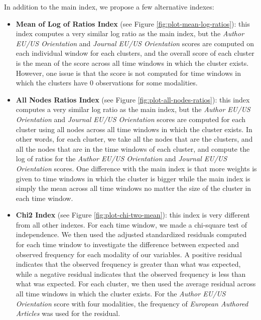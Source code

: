 \documentclass[
  12pt,
  onecolumn]{article}
\providecommand{\tightlist}{%
  \setlength{\itemsep}{0pt}\setlength{\parskip}{0pt}}
\begin{document}
In addition to the main index, we propose a few alternative indexes:

\begin{itemize}
\tightlist
\item
  \textbf{Mean of Log of Ratios Index} (see Figure
  \ref{fig:plot-mean-log-ratios}): this index computes a very similar
  log ratio as the main index, but the \emph{Author EU/US Orientation}
  and \emph{Journal EU/US Orientation} scores are computed on each
  individual window for each clusters, and the overall score of each
  cluster is the mean of the score across all time windows in which the
  cluster exists. However, one issue is that the score is not computed
  for time windows in which the clusters have 0 observations for some
  modalities.
\item
  \textbf{All Nodes Ratios Index} (see Figure
  \ref{fig:plot-all-nodes-ratios}): this index computes a very similar
  log ratio as the main index, but the \emph{Author EU/US Orientation}
  and \emph{Journal EU/US Orientation} scores are computed for each
  cluster using all nodes across all time windows in which the cluster
  exists. In other words, for each cluster, we take all the nodes that
  are the clusters, and all the nodes that are in the time windows of
  each cluster, and compute the log of ratios for the \emph{Author EU/US
  Orientation} and \emph{Journal EU/US Orientation} scores. One
  difference with the main index is that more weights is given to time
  windows in which the cluster is bigger while the main index is simply
  the mean across all time windows no matter the size of the cluster in
  each time window.
\item
  \textbf{Chi2 Index} (see Figure \ref{fig:plot-chi-two-mean}): this
  index is very different from all other indexes. For each time window,
  we made a chi-square test of independence. We then used the adjusted
  standardized residuals computed for each time window to investigate
  the difference between expected and observed frequency for each
  modality of our variables. A positive residual indicates that the
  observed frequency is greater than what was expected, while a negative
  residual indicates that the observed frequency is less than what was
  expected. For each cluster, we then used the average residual across
  all time windows in which the cluster exists. For the \emph{Author
  EU/US Orientation} score with four modalities, the frequency of
  \emph{European Authored Articles} was used for the residual.
\end{itemize}
\end{document}
